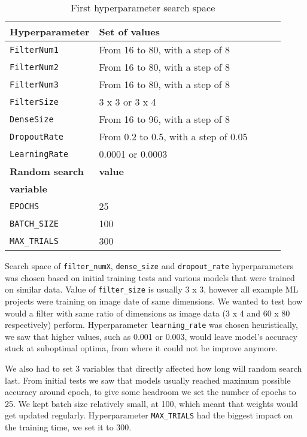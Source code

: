 \begin{table}
    \centering
    \caption{ First hyperparameter search space}
    \begin{tabular}{@{} *5l @{}}    \toprule
        \textbf{Hyperparameter} & \textbf{Set of values}\\\midrule
        \verb|FilterNum1|       & From 16 to 80, with a step of 8\\ 
        \verb|FilterNum2|       & From 16 to 80, with a step of 8\\ 
        \verb|FilterNum3|       & From 16 to 80, with a step of 8\\
        \verb|FilterSize|       & 3 x 3 or 3 x 4\\
        \verb|DenseSize|        & From 16 to 96, with a step of 8\\
        \verb|DropoutRate|      & From 0.2 to 0.5, with a step of 0.05\\
        \verb|LearningRate|     & 0.0001 or 0.0003\\\toprule
        \textbf{Random search}  & \textbf{value}\\
        \textbf{variable}       & \\\midrule
        \verb|EPOCHS|           & 25\\
        \verb|BATCH_SIZE|       & 100\\
        \verb|MAX_TRIALS|       & 300\\\bottomrule
    \end{tabular}
    \label{hyper_table1}
\end{table}

Search space of \verb|filter_numX|, \verb|dense_size| and \verb|dropout_rate| hyperparameters was chosen based on initial training tests and various models that were trained on similar data.
Value of \verb|filter_size| is usually 3 x 3, however all example ML projects were training on image date of same dimensions.
We wanted to test how would a filter with same ratio of dimensions as image data (3 x 4 and 60 x 80 respectively) perform.
Hyperparameter \verb|learning_rate| was chosen heuristically, we saw that higher values, such as 0.001 or 0.003, would leave model's accuracy stuck at suboptimal optima, from where it could not be improve anymore.

We also had to set 3 variables that directly affected how long will random search last.
From initial tests we saw that models usually reached maximum possible accuracy around  epoch, to give some headroom we set the number of epochs to 25.
We kept batch size relatively small, at 100, which meant that weights would get updated regularly.
Hyperparameter \verb|MAX_TRIALS| had the biggest impact on the training time, we set it to 300.

